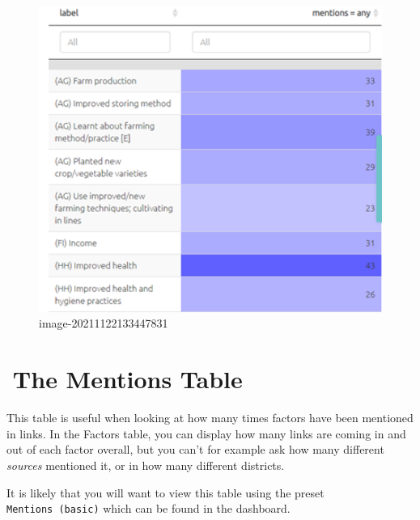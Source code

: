 \documentclass[
]{book}
\begin{document}
\begin{figure}
\centering
\includegraphics[width=6.77083in,height=\textheight]{_assets/image-20211122133447831.png}
\caption{image-20211122133447831}
\end{figure}

\hypertarget{xthe-mentions-table}{%
\chapter{🧪The Mentions Table}\label{xthe-mentions-table}}

This table is useful when looking at how many times factors have been mentioned in links. In the Factors table, you can display how many links are coming in and out of each factor overall, but you can't for example ask how many different \emph{sources} mentioned it, or in how many different districts.

It is likely that you will want to view this table using the preset \texttt{Mentions\ (basic)} which can be found in the dashboard.
\end{document}
